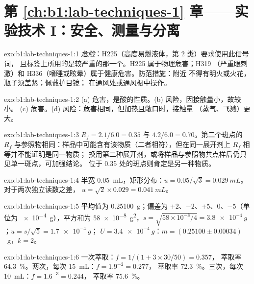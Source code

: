 \section*{第 \ref{ch:b1:lab-techniques-1} 章——实验技术 I：安全、测量与分离}

\begin{solution}{exo:b1:lab-techniques-1:1}
\emph{危险}：H225（高度易燃液体，第 2 类）要求使用此信号词，
且标签上所用的是较严重的那一个。H225 属于物理危害；H319
（严重眼刺激）和 H336（嗜睡或眩晕）属于健康危害。防范措施：附近
不得有明火或火花，瓶子须盖紧；佩戴护目镜；
在通风处或通风橱中操作。
\end{solution}

\begin{solution}{exo:b1:lab-techniques-1:2}
(a) 危害，是酸的性质。(b) 风险，因接触量小，故较小。
(c) 危害。(d) 风险：危害相同，但加热且敞口时，接触量
（蒸气、飞溅）更大。
\end{solution}

\begin{solution}{exo:b1:lab-techniques-1:3}
$R_f = 2.1/6.0 = 0.35$ 与 $4.2/6.0 = 0.70$。第二个斑点的 $R_f$
与参照物相同：样品中可能含有该物质（二者相符），但在同一展开剂上
$R_f$ 相等并不能证明是同一物质；
换用第二种展开剂，或将样品与参照物共点样后仍只见单一斑点，可加强结论。
位于 0.35 处的斑点则肯定是另一种物质。
\end{solution}

\begin{solution}{exo:b1:lab-techniques-1:4}
半宽 \qty{0.05}{mL}，矩形分布：$u = 0.05/\sqrt3 = \qty{0.029}{mL}$。
对于两次独立读数之差，
$u = \sqrt{2} \times 0.029 = \qty{0.041}{mL}$。
\end{solution}

\begin{solution}{exo:b1:lab-techniques-1:5}
平均值为 \qty{0.25100}{g}；偏差为 $+2$、$-2$、$+5$、0、$-5$（单位为
\qty{e-4}{g}），平方和为 \qty{58e-8}{g^2}，$s = \sqrt{58 \times
10^{-8}/4} = \qty{3.8e-4}{g}$；$u = s/\sqrt5 = \qty{1.7e-4}{g}$；
$U = \qty{3.4e-4}{g}$：$m = (0.25100 \pm 0.00034)$~g，$k = 2$。
\end{solution}

\begin{solution}{exo:b1:lab-techniques-1:6}
一次萃取：$f = 1/(1 + 3 \times 30/50) = 0.357$，
萃取率 \qty{64.3}{\percent}。两次，每次 \qty{15}{mL}：$f = 1.9^{-2} = 0.277$，
萃取率 \qty{72.3}{\percent}。三次，每次 \qty{10}{mL}：$f = 1.6^{-3} = 0.244$，
萃取率 \qty{75.6}{\percent}。
\end{solution}

